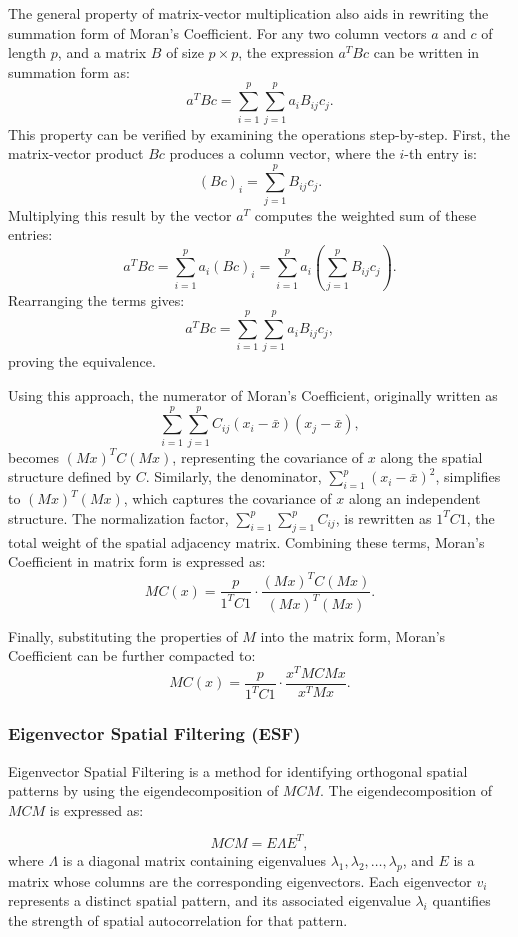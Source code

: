 \documentclass[12pt]{article}
\begin{document}
The general property of matrix-vector multiplication also aids in rewriting the summation form of Moran's Coefficient. For any two column vectors \( a \) and \( c \) of length \( p \), and a matrix \( B \) of size \( p \times p \), the expression \( a^T B c \) can be written in summation form as:
\[
	a^T B c = \sum_{i=1}^p \sum_{j=1}^p a_i B_{ij} c_j.
\]
This property can be verified by examining the operations step-by-step. First, the matrix-vector product \( Bc \) produces a column vector, where the \( i \)-th entry is:
\[
	(Bc)_i = \sum_{j=1}^p B_{ij} c_j.
\]
Multiplying this result by the vector \( a^T \) computes the weighted sum of these entries:
\[
	a^T B c = \sum_{i=1}^p a_i (Bc)_i = \sum_{i=1}^p a_i \left( \sum_{j=1}^p B_{ij} c_j \right).
\]
Rearranging the terms gives:
\[
	a^T B c = \sum_{i=1}^p \sum_{j=1}^p a_i B_{ij} c_j,
\]
proving the equivalence.

Using this approach, the numerator of Moran's Coefficient, originally written as
\[
	\sum_{i=1}^p \sum_{j=1}^p C_{ij} (x_i - \bar{x})(x_j - \bar{x}),
\]
becomes \( (Mx)^T C (Mx) \), representing the covariance of \( x \) along the spatial structure defined by \( C \). Similarly, the denominator, \( \sum_{i=1}^p (x_i - \bar{x})^2 \), simplifies to \( (Mx)^T (Mx) \), which captures the covariance of \( x \) along an independent structure. The normalization factor, \( \sum_{i=1}^p \sum_{j=1}^p C_{ij} \), is rewritten as \( 1^T C 1 \), the total weight of the spatial adjacency matrix. Combining these terms, Moran’s Coefficient in matrix form is expressed as:
\[
	MC(x) = \frac{p}{1^T C 1} \cdot \frac{(Mx)^T C (Mx)}{(Mx)^T (Mx)}.
\]

Finally, substituting the properties of \( M \) into the matrix form, Moran’s Coefficient can be further compacted to:
\[
	MC(x) = \frac{p}{1^T C 1} \cdot \frac{x^T M C M x}{x^T M x}.
\]


\subsubsection{Eigenvector Spatial Filtering (ESF)}

Eigenvector Spatial Filtering is a method for identifying orthogonal spatial patterns by using the eigendecomposition of \( MCM \). The eigendecomposition of \( MCM \) is expressed as:

\[
	MCM = E \Lambda E^T,
\]
where \( \Lambda \) is a diagonal matrix containing eigenvalues \( \lambda_1, \lambda_2, \ldots, \lambda_p \), and \( E \) is a matrix whose columns are the corresponding eigenvectors. Each eigenvector \( v_i \) represents a distinct spatial pattern, and its associated eigenvalue \( \lambda_i \) quantifies the strength of spatial autocorrelation for that pattern.
\end{document}
